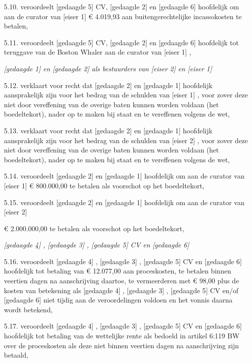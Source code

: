 \documentclass[
  dutch,
  a4paper,
]{article}
\begin{document}
5.10. veroordeelt {[}gedaagde 5{]} CV, {[}gedaagde 2{]} en {[}gedaagde 6{]} hoofdelijk om aan de curator van {[}eiser 1{]} € 4.019,93 aan buitengerechtelijke incassokosten te betalen,

5.11. veroordeelt {[}gedaagde 5{]} CV, {[}gedaagde 2{]} en {[}gedaagde 6{]} hoofdelijk tot teruggave van de Boston Whaler aan de curator van {[}eiser 1{]} ,

\emph{{[}gedaagde 1{]} en {[}gedaagde 2{]} als bestuurders van {[}eiser 2{]} en {[}eiser 1{]}}

5.12. verklaart voor recht dat {[}gedaagde 2{]} en {[}gedaagde 1{]} hoofdelijk aansprakelijk zijn voor het bedrag van de schulden van {[}eiser 1{]} , voor zover deze niet door vereffening van de overige baten kunnen worden voldaan (het boedeltekort), nader op te maken bij staat en te vereffenen volgens de wet,

5.13. verklaart voor recht dat {[}gedaagde 2{]} en {[}gedaagde 1{]} hoofdelijk aansprakelijk zijn voor het bedrag van de schulden van {[}eiser 2{]} , voor zover deze niet door vereffening van de overige baten kunnen worden voldaan (het boedeltekort), nader op te maken bij staat en te vereffenen volgens de wet,

5.14. veroordeelt {[}gedaagde 2{]} en {[}gedaagde 1{]} hoofdelijk om aan de curator van {[}eiser 1{]} € 800.000,00 te betalen als voorschot op het boedeltekort,

5.15. veroordeelt {[}gedaagde 2{]} en {[}gedaagde 1{]} hoofdelijk om aan de curator van {[}eiser 2{]}

€ 2.000.000,00 te betalen als voorschot op het boedeltekort,

\emph{{[}gedaagde 4{]} , {[}gedaagde 3{]} , {[}gedaagde 5{]} CV en {[}gedaagde 6{]}}

5.16. veroordeelt {[}gedaagde 4{]} , {[}gedaagde 3{]} , {[}gedaagde 5{]} CV en {[}gedaagde 6{]} hoofdelijk tot betaling van € 12.077,00 aan proceskosten, te betalen binnen veertien dagen na aanschrijving daartoe, te vermeerderen met € 98,00 plus de kosten van betekening als {[}gedaagde 4{]} , {[}gedaagde 3{]} , {[}gedaagde 5{]} CV en/of {[}gedaagde 6{]} niet tijdig aan de veroordelingen voldoen en het vonnis daarna wordt betekend,

5.17. veroordeelt {[}gedaagde 4{]} , {[}gedaagde 3{]} , {[}gedaagde 5{]} CV en {[}gedaagde 6{]} hoofdelijk tot betaling van de wettelijke rente als bedoeld in artikel 6:119 BW over de proceskosten als deze niet binnen veertien dagen na aanschrijving zijn betaald,
\end{document}
